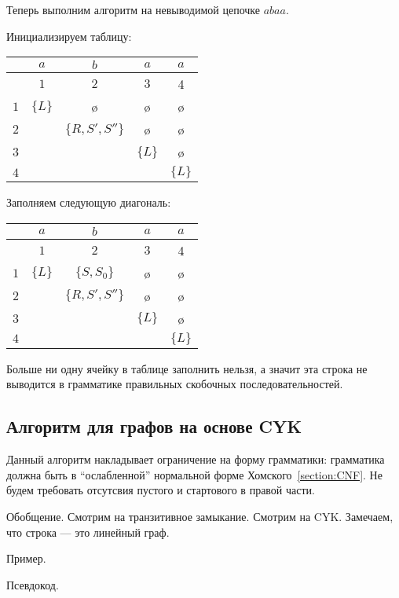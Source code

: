 \begin{example}
  Теперь выполним алгоритм на невыводимой цепочке $abaa$. 

  Инициализируем таблицу:

  \begin{center}
    \begin{tabular}{c||cc|cc}
      & $a$ & $b$ & $a$ & $a$ \\ \hline
      & $1$ & $2$ & $3$ & 4 \\ \hline \hline 
    $1$ & $\{L\}$ & \o & \o & \o \\ 
    $2$ &   & $\{R, S', S''\}$ & \o & \o \\ 
    $3$ &   &   & $\{L\}$ & \o \\ \hline
    $4$ &   &   &   & $\{L\}$ \\ 
    \end{tabular}
  \end{center}

  Заполняем следующую диагональ: 

  \begin{center}
    \begin{tabular}{c||cc|cc}
      & $a$ & $b$ & $a$ & $a$ \\ \hline
      & $1$ & $2$ & $3$ & 4 \\ \hline \hline 
    $1$ & $\{L\}$ & $\{S, S_0\}$ & \o & \o \\ 
    $2$ &   & $\{R, S', S''\}$ & \o & \o \\ 
    $3$ &   &   & $\{L\}$ & \o \\ \hline
    $4$ &   &   &   & $\{L\}$ \\ 
    \end{tabular}
  \end{center}


  Больше ни одну ячейку в таблице заполнить нельзя, а значит эта строка не выводится в грамматике правильных скобочных последовательностей. 

\end{example}

\subsection{Алгоритм для графов на основе CYK}

Данный алгоритм накладывает ограничение на форму грамматики: грамматика должна быть в ``ослабленной'' нормальной форме Хомского~\ref{section:CNF}.
Не будем требовать отсутсвия пустого и стартового в правой части.

Обобщение.
Смотрим на транзитивное замыкание.
Смотрим на CYK.
Замечаем, что строка --- это линейный граф.

\begin{example}
Пример.
\end{example}

Псевдокод.
